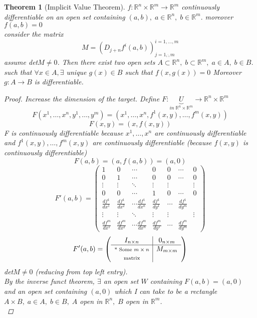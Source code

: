 \documentclass[12pt]{article}
\def\RR{\mathbb{R}}
\newtheorem{theorem}{Theorem}[section]
\begin{document}
\begin{theorem}[Implicit Value Theorem]\label{implicitvalue}
$f:\RR^n \times \RR^m \rightarrow \RR^m$ continuously differentiable on an open set containing $(a,b), \; a \in \RR^n , \; b \in \RR^m.$ moreover $f(a,b)=0$\\
consider the matrix \[M=(D_{j+n}f^{i}(a,b))^{i=1,\dots,m}_{j=1,\dot,m}\] assume det$M \neq 0$. Then there exist two open sets $A \subset \RR^n, \; b \subset \RR^m, \; a \in A, \; b \in B$. such that $\forall x \in A, \exists$ unique $g(x) \in B$ such that $f(x,g(x))=0$ Moreover $g:A \rightarrow B$ is differentiable.
\begin{proof} 
Increase the dimension of the target. Define $F:\underbrace{U}_{in \;  \RR^n \times \RR^m} \rightarrow \RR^n \times \RR^m$
\[F(x^1,\dots , x^n,y^1, \dots,y^m) = (x^1, \dots , x^n, f^1(x,y), \dots , f^m(x,y))\]
\[F(x,y) = (x,f(x,y))\]
F is continuously differentiable because $x^1 , \dots , x^n$ are continuously differentiable and $f^1(x,y), \dots , f^m(x,y)$ are continuously differentiable (because $f(x,y)$ is continuously differentiable)
\[F(a,b) = (a,f(a,b)) = (a,0)\]
\[
 F'(a,b) =
 \left( \begin{array}{cccc|ccc}
 1 & 0 & \cdots & 0 & 0 & \cdots & 0 \\
0 & 1 & \cdots & 0 & 0 & \cdots & 0 \\
  \vdots  & \vdots  & \ddots & \vdots & \vdots & & \vdots \\
0 & 0 & \cdots & 1 & 0 & \cdots & 0 \\
\hline
  \frac{df^1}{dx^1} & \frac{df^1}{dx^2}& \cdots\frac{df^1}{dx^n} & \frac{df^1}{dy^1} & \cdots & \frac{df^1}{dy^m}\\
\vdots  & \vdots  & \ddots & \vdots & \vdots & & \vdots \\
  \frac{df^m}{dx^1} & \frac{df^m}{dx^2}& \cdots\frac{df^m}{dx^n} & \frac{df^m}{dy^1} & \cdots & \frac{df^m}{dy^m}
 \end{array} \right)
\]
\[ F'(a,b) =
 \left( \begin{array}{c|c}
 I_{n \times n} & 0_{n \times m}\\
\hline
\text{\scriptsize * Some $m \times n$} & M_{m \times m}\\
\text{\scriptsize matrix} & 
 \end{array} \right) \]
det$M \neq 0$ (reducing from top left entry).\\
By the inverse funct theorem, $\exists$ an open set $W$ containing $F(a,b) = (a,0)$ and an open set containing $(a,0)$ which I can take to be a rectangle $A \times B, \;  a \in A , \; b \in B, \; A$ open in $\RR^n, \; B$ open in $\RR^m$.\\

\end{proof}
\end{theorem}
\end{document}
